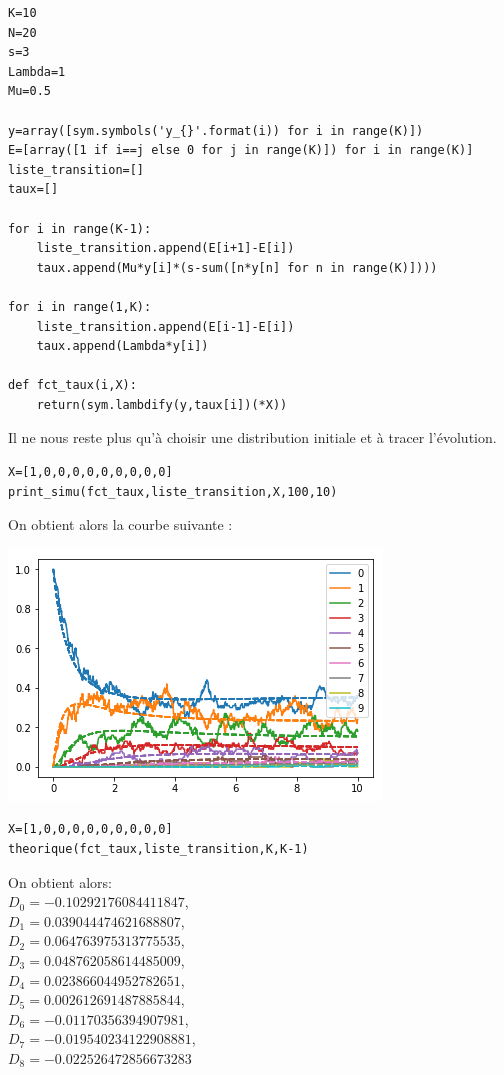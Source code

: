 \documentclass[a4paper,12pt]{report}
\def\D{\displaystyle}
\begin{document}
\newpage
\begin{lstlisting}[frame=single]
K=10
N=20
s=3
Lambda=1
Mu=0.5

y=array([sym.symbols('y_{}'.format(i)) for i in range(K)])
E=[array([1 if i==j else 0 for j in range(K)]) for i in range(K)]
liste_transition=[]
taux=[]

for i in range(K-1):
    liste_transition.append(E[i+1]-E[i])
    taux.append(Mu*y[i]*(s-sum([n*y[n] for n in range(K)])))
    
for i in range(1,K):
    liste_transition.append(E[i-1]-E[i])
    taux.append(Lambda*y[i])
    
def fct_taux(i,X):
    return(sym.lambdify(y,taux[i])(*X))
\end{lstlisting}

Il ne nous reste plus qu'à choisir une distribution initiale et à tracer
l'évolution.

\begin{lstlisting}[frame=single]
X=[1,0,0,0,0,0,0,0,0,0]
print_simu(fct_taux,liste_transition,X,100,10)
\end{lstlisting}

On obtient alors la courbe suivante :

\begin{center}
  \includegraphics{velov.png}
\end{center}

\newpage
\begin{lstlisting}[frame=single]
X=[1,0,0,0,0,0,0,0,0,0]
theorique(fct_taux,liste_transition,K,K-1)
\end{lstlisting}

On obtient alors: \\
$\D D_0=-0.10292176084411847$, \\
$\D D_1=0.039044474621688807$, \\
$\D D_2=0.064763975313775535$,\\
$\D D_3=0.048762058614485009$,\\
$\D D_4=0.023866044952782651$,\\
$\D D_5=0.002612691487885844$,\\
$\D D_6=-0.01170356394907981$,\\
$\D D_7=-0.019540234122908881$,\\
$\D D_8=-0.022526472856673283$ 
\end{document}
